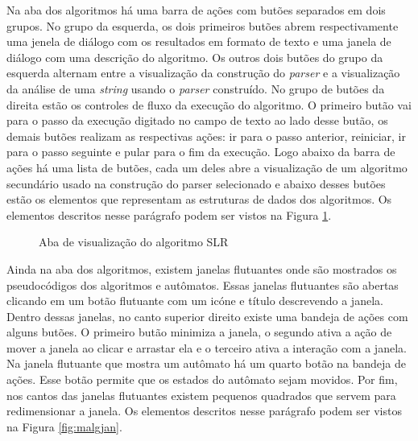 Na aba dos algoritmos há uma barra de ações com butões separados em dois grupos. No grupo da esquerda, os dois primeiros butões abrem respectivamente uma jenela de diálogo com os resultados em formato de texto e uma janela de diálogo com uma descrição do algoritmo. Os outros dois butões do grupo da esquerda alternam entre a visualização da construção do \textit{parser} e a visualização da análise de uma \textit{string} usando o \textit{parser} construído. No grupo de butões da direita estão os controles de fluxo da execução do algoritmo. O primeiro butão vai para o passo da execução digitado no campo de texto ao lado desse butão, os demais butões realizam as respectivas ações: ir para o passo anterior, reiniciar, ir para o passo seguinte e pular para o fim da execução. Logo abaixo da barra de ações há uma lista de butões, cada um deles abre a visualização de um algoritmo secundário usado na construção do parser selecionado e abaixo desses butões estão os elementos que representam as estruturas de dados dos algoritmos. Os elementos descritos nesse parágrafo podem ser vistos na Figura \ref{fig:malg}.

\begin{figure}[ht]
  \centering
  \captionsetup{width=16cm}
  \caption{Aba de visualização do algoritmo SLR}
  \label{fig:malg}
\end{figure}

Ainda na aba dos algoritmos, existem janelas flutuantes onde são mostrados os pseudocódigos dos algoritmos e autômatos. Essas janelas flutuantes são abertas clicando em um botão flutuante com um icóne e título descrevendo a janela. Dentro dessas janelas, no canto superior direito existe uma bandeja de ações com alguns butões. O primeiro butão minimiza a janela, o segundo ativa a ação de mover a janela ao clicar e arrastar ela e o terceiro ativa a interação com a janela. Na janela flutuante que mostra um autômato há um quarto botão na bandeja de ações. Esse botão permite que os estados do autômato sejam movidos. Por fim, nos cantos das janelas flutuantes existem pequenos quadrados que servem para redimensionar a janela. Os elementos descritos nesse parágrafo podem ser vistos na Figura \ref{fig:malgjan}.

